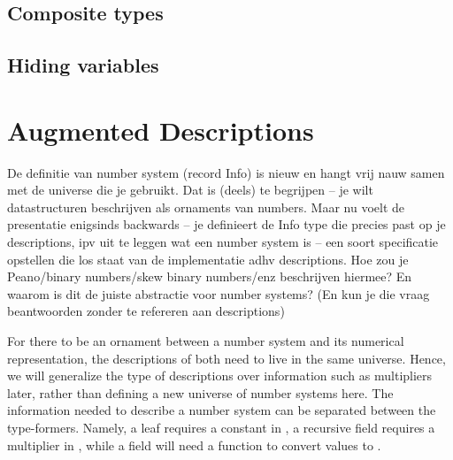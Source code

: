 \subsection{Composite types}

\subsection{Hiding variables}



\section{Augmented Descriptions}
\begin{outline}
    De definitie van number system (record Info) is nieuw en hangt vrij
   nauw samen met de universe die je gebruikt. Dat is (deels) te
   begrijpen -- je wilt datastructuren beschrijven als ornaments van
   numbers. Maar nu voelt de presentatie enigsinds backwards -- je
   definieert de Info type die precies past op je descriptions, ipv uit
   te leggen wat een number system is -- een soort specificatie
   opstellen die los staat van de implementatie adhv descriptions. Hoe
   zou je Peano/binary numbers/skew binary numbers/enz beschrijven
   hiermee? En waarom is dit de juiste abstractie voor number systems?
   (En kun je die vraag beantwoorden zonder te refereren aan
   descriptions)
\end{outline}


For there to be an ornament between a number system and its numerical representation, the descriptions of both need to live in the same universe. Hence, we will generalize the type of descriptions over information such as multipliers later, rather than defining a new universe of number systems here. The information needed to describe a number system can be separated between the type-formers. Namely, a leaf  requires a constant in \bN{}, a recursive field  requires a multiplier in \bN{}, while a field  will need a function to convert values to \bN{}.

